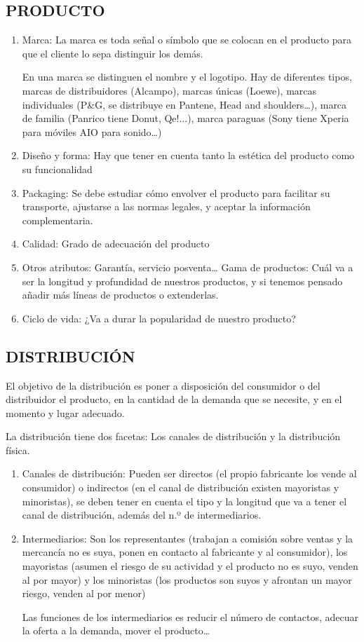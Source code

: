 \documentclass[12pt, twoside, openright]{report} %
\begin{document}
\subsection{PRODUCTO}
\begin{enumerate}
	\item Marca: La marca es toda señal o símbolo que se colocan en el producto para que el cliente lo sepa distinguir los demás.

	      En una marca se distinguen el nombre y el logotipo.
	      \pagebreak
	      Hay de diferentes tipos, marcas de distribuidores (Alcampo), marcas únicas (Loewe), marcas
	      individuales (P\&G, se distribuye en Pantene, Head and shoulders…), marca de familia (Panrico
	      tiene Donut, Qe!...), marca paraguas (Sony tiene Xperia para móviles AIO para sonido…)
	\item Diseño y forma: Hay que tener en cuenta tanto la estética del producto como su funcionalidad
	\item Packaging: Se debe estudiar cómo envolver el producto para facilitar su transporte, ajustarse a
	      las normas legales, y aceptar la información complementaria.
	\item Calidad: Grado de adecuación del producto
	\item Otros atributos: Garantía, servicio posventa…
	      Gama de productos: Cuál va a ser la longitud y profundidad de nuestros productos, y si
	      tenemos pensado añadir más líneas de productos o extenderlas.
	\item Ciclo de vida: ¿Va a durar la popularidad de nuestro producto?
\end{enumerate}

\subsection{DISTRIBUCIÓN}
El objetivo de la distribución es poner a disposición del consumidor o del distribuidor el producto, en
la cantidad de la demanda que se necesite, y en el momento y lugar adecuado.

La distribución tiene dos facetas: Los canales de distribución y la distribución física.
\begin{enumerate}
	\item Canales de distribución: Pueden ser directos (el propio fabricante los vende al consumidor) o
	      indirectos (en el canal de distribución existen mayoristas y minoristas), se deben tener en
	      cuenta el tipo y la longitud que va a tener el canal de distribución, además del n.º de
	      intermediarios.

	\item Intermediarios: Son los representantes (trabajan a comisión sobre ventas y la mercancía no es
	      suya, ponen en contacto al fabricante y al consumidor), los mayoristas (asumen el riesgo de su
	      actividad y el producto no es suyo, venden al por mayor) y los minoristas (los productos son
	      suyos y afrontan un mayor riesgo, venden al por menor)

	      Las funciones de los intermediarios es reducir el número de contactos, adecuar la oferta a la
	      demanda, mover el producto…
\end{enumerate}
\end{document}
